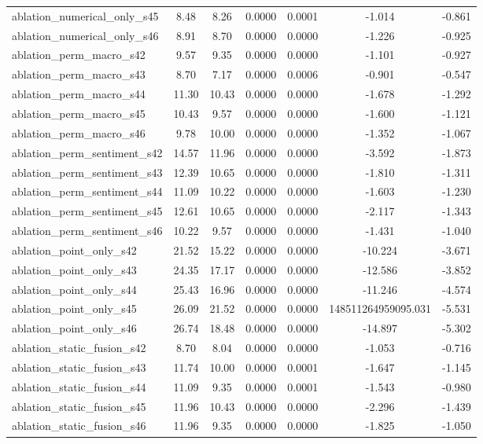 \begin{table}
\begin{tabular}{lcccccc}
ablation_numerical_only_s45 & 8.48 & 8.26 & 0.0000 & 0.0001 & -1.014 & -0.861 \\
ablation_numerical_only_s46 & 8.91 & 8.70 & 0.0000 & 0.0000 & -1.226 & -0.925 \\
ablation_perm_macro_s42 & 9.57 & 9.35 & 0.0000 & 0.0000 & -1.101 & -0.927 \\
ablation_perm_macro_s43 & 8.70 & 7.17 & 0.0000 & 0.0006 & -0.901 & -0.547 \\
ablation_perm_macro_s44 & 11.30 & 10.43 & 0.0000 & 0.0000 & -1.678 & -1.292 \\
ablation_perm_macro_s45 & 10.43 & 9.57 & 0.0000 & 0.0000 & -1.600 & -1.121 \\
ablation_perm_macro_s46 & 9.78 & 10.00 & 0.0000 & 0.0000 & -1.352 & -1.067 \\
ablation_perm_sentiment_s42 & 14.57 & 11.96 & 0.0000 & 0.0000 & -3.592 & -1.873 \\
ablation_perm_sentiment_s43 & 12.39 & 10.65 & 0.0000 & 0.0000 & -1.810 & -1.311 \\
ablation_perm_sentiment_s44 & 11.09 & 10.22 & 0.0000 & 0.0000 & -1.603 & -1.230 \\
ablation_perm_sentiment_s45 & 12.61 & 10.65 & 0.0000 & 0.0000 & -2.117 & -1.343 \\
ablation_perm_sentiment_s46 & 10.22 & 9.57 & 0.0000 & 0.0000 & -1.431 & -1.040 \\
ablation_point_only_s42 & 21.52 & 15.22 & 0.0000 & 0.0000 & -10.224 & -3.671 \\
ablation_point_only_s43 & 24.35 & 17.17 & 0.0000 & 0.0000 & -12.586 & -3.852 \\
ablation_point_only_s44 & 25.43 & 16.96 & 0.0000 & 0.0000 & -11.246 & -4.574 \\
ablation_point_only_s45 & 26.09 & 21.52 & 0.0000 & 0.0000 & 148511264959095.031 & -5.531 \\
ablation_point_only_s46 & 26.74 & 18.48 & 0.0000 & 0.0000 & -14.897 & -5.302 \\
ablation_static_fusion_s42 & 8.70 & 8.04 & 0.0000 & 0.0000 & -1.053 & -0.716 \\
ablation_static_fusion_s43 & 11.74 & 10.00 & 0.0000 & 0.0001 & -1.647 & -1.145 \\
ablation_static_fusion_s44 & 11.09 & 9.35 & 0.0000 & 0.0001 & -1.543 & -0.980 \\
ablation_static_fusion_s45 & 11.96 & 10.43 & 0.0000 & 0.0000 & -2.296 & -1.439 \\
ablation_static_fusion_s46 & 11.96 & 9.35 & 0.0000 & 0.0000 & -1.825 & -1.050 \\

\end{tabular}
\end{table}
